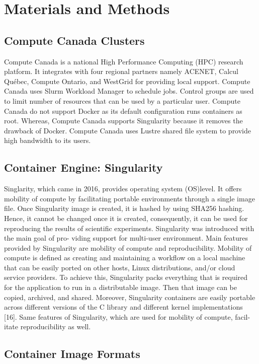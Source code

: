 \documentclass[a4paper,num-refs]{oup-contemporary}
\begin{document}
\section{Materials and Methods}

\subsection{Compute Canada Clusters}
Compute Canada is a national High Performance Computing (HPC) research platform.
It integrates with four regional partners namely ACENET, Calcul Québec, Compute
Ontario, and WestGrid for providing local support.
Compute Canada uses Slurm Workload Manager to schedule jobs.
Control groups are used to limit number of resources that can be used
by a particular user.
Compute Canada do not support Docker as its default configuration
runs containers as root. Whereas, Compute Canada supports Singularity
because it removes the drawback of Docker.
Compute Canada uses Lustre shared file system to provide high
bandwidth to its users.

\subsection{Container Engine: Singularity}

Singlarity, which came in 2016, provides operating system (OS)level.
It offers mobility of compute by facilitating portable environments 
through a single image file. Once Singularity image
is created, it is hashed by using SHA256 hashing. Hence, it cannot be changed
once it is created, consequently, it can be used for reproducing the results of
scientific experiments. Singularity was introduced with the main goal of pro-
viding support for multi-user environment. Main features provided by
Singularity are mobility of compute and reproducibility.
Mobility of compute is defined as creating and maintaining a workflow on
a local machine that can be easily ported on other hosts, Linux distributions,
and/or cloud service providers. To achieve this, Singularity packs everything
that is required for the application to run in a distributable image. Then that
image can be copied, archived, and shared. Moreover, Singularity containers
are easily portable across different versions of the C library and different kernel
implementations [16].
Same features of Singularity, which are used for mobility of compute, facil-
itate reproducibility as well.

\subsection{Container Image Formats}
\end{document}
